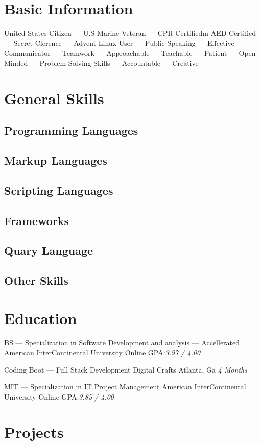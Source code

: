\documentclass{resume-class/nadario_resume}
\begin{document}
\makecvtitle{}
\section{Basic Information}
United States Citizen --- U.S Marine Veteran --- CPR Certifiedm AED Certified --- Secret
Clerence --- Advent Linux User --- Public Speaking --- Effective Communicator ---
Teamwork --- Approachable --- Teachable ---
Patient --- Open-Minded --- Problem Solving Skills --- Accountable --- Creative

\section{General Skills}
\subsection{Programming Languages}
\subsection{Markup Languages}
\subsection{Scripting Languages}
\subsection{Frameworks}
\subsection{Quary Language}
\subsection{Other Skills}

\section{Education}
        {BS --- Specialization in Software Development and analysis --- Accellerated}
        {American InterContinental University}
        {Online}
        {}{GPA:\textit{3.97 / 4.00}}
        \vspace{.25cm}

        {Coding Boot --- Full Stack Development}
        {Digital Crafts}
        {Atlanta, Ga}
        {}{\textit{4 Months}}
        \vspace{.25cm}

        {MIT --- Specialization in IT Project Management}
        {American InterContinental University}
        {Online}
        {}{GPA:\textit{3.85 / 4.00}}
        \vspace{.25cm}

\section{Projects}
\end{document}
